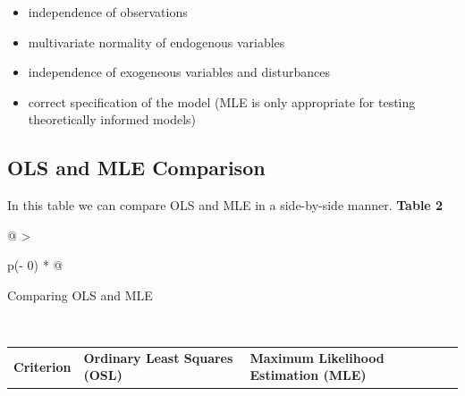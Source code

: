\documentclass[
  11pt,
]{book}
\providecommand{\tightlist}{%
  \setlength{\itemsep}{0pt}\setlength{\parskip}{0pt}}
\begin{document}
\begin{itemize}
  \begin{itemize}
  \tightlist
  \item
    independence of observations
  \item
    multivariate normality of endogenous variables
  \item
    independence of exogeneous variables and disturbances
  \item
    correct specification of the model (MLE is only appropriate for testing theoretically informed models)
  \end{itemize}
\end{itemize}

\hypertarget{ols-and-mle-comparison}{%
\subsection{OLS and MLE Comparison}\label{ols-and-mle-comparison}}

In this table we can compare OLS and MLE in a side-by-side manner. \textbf{Table 2}

\begin{longtable}[]{@{}
  >{\raggedright\arraybackslash}p{(\columnwidth - 0\tabcolsep) * }@{}}
\toprule\noalign{}
\begin{minipage}[b]{\linewidth}\raggedright
Comparing OLS and MLE \citep{cohen_applied_2003, myung_tutorial_2003}
\end{minipage} \\
\midrule\noalign{}
\endhead
\bottomrule\noalign{}
\endlastfoot
\end{longtable}

\begin{longtable}[]{@{}
  >{\centering\arraybackslash}p{}
  >{\centering\arraybackslash}p{}
  >{\centering\arraybackslash}p{}@{}}
\toprule\noalign{}
\endhead
\bottomrule\noalign{}
\endlastfoot
\textbf{Criterion} & \textbf{Ordinary Least Squares (OSL)} & \textbf{Maximum Likelihood Estimation (MLE)} \\
\end{longtable}
\end{document}
